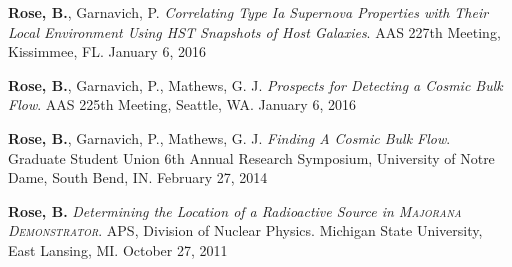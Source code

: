 \documentclass[margin]{res}
\begin{document}
\begin{resume}
{\bf Rose, B.}, Garnavich, P. {\sl Correlating Type Ia Supernova Properties with Their Local Environment Using HST Snapshots of Host Galaxies}. AAS 227th Meeting, Kissimmee, FL. January 6, 2016

{\bf Rose, B.}, Garnavich, P., Mathews, G. J. {\sl Prospects for Detecting a Cosmic Bulk Flow}. AAS 225th Meeting, Seattle, WA. January 6, 2016

{\bf Rose, B.}, Garnavich, P., Mathews, G. J. {\sl Finding A Cosmic Bulk Flow}. Graduate Student Union 6th Annual Research Symposium, University of Notre Dame, South Bend, IN. February 27, 2014

{\bf Rose, B.} {\sl Determining the Location of a Radioactive Source in \textsc{Majorana Demonstrator}}. APS, Division of Nuclear Physics. Michigan State University, East Lansing, MI. October 27, 2011












\end{resume}
\end{document}
